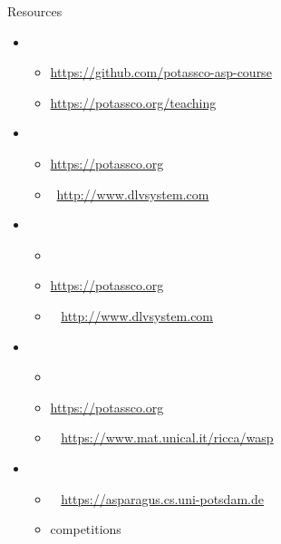 \begin{frame}{Resources}
  \begin{itemize}
  \item {}
    \begin{itemize}
    \item \url{https://github.com/potassco-asp-course}
    \item \url{https://potassco.org/teaching}
    \end{itemize}
  \item {}
    \begin{itemize}
    \item \alert{\clingo} \cite{gekakasc17a}\hfill \url{https://potassco.org}
    \item \dlv\           \cite{dlv03a,alcadofuleperiveza17a}\hfill \url{http://www.dlvsystem.com}
    \end{itemize}
  \item {}
    \begin{itemize}
    \item \lparse\                                                %
    \item \alert{\gringo} \cite{gescth07a,gekaosscth09a,gekakosc11a}\hfill \url{https://potassco.org}
    \item \idlv\          \cite{cafupeza17a}                        \hfill\url{http://www.dlvsystem.com}
    \end{itemize}
  \item {}
    \begin{itemize}
    \item \smodels\       \cite{niesim96a,siniso02a}              %
    \item \alert{\clasp}  \cite{gekanesc07a,gekasc09c}              \hfill \url{https://potassco.org}
    \item \wasp\          \cite{aldofaleri13a}                      \hfill \url{https://www.mat.unical.it/ricca/wasp}
    \end{itemize}
  \item {}
    \begin{itemize}
    \item \asparagus\     \cite{boansctr04a}                        \hfill \url{https://asparagus.cs.uni-potsdam.de}
    \item competitions \cite{contest07a,contest09a,contest11a,contest13a,cagemari14a}
    \end{itemize}
  \end{itemize}
\end{frame}
%
